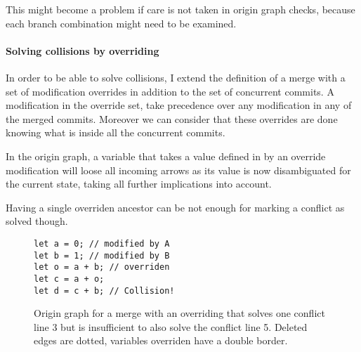 \documentclass[a4paper,10pt]{article}
\begin{document}
This might become a problem if care is not taken in origin graph checks, because each branch combination might need to be examined.

\paragraph{Solving collisions by overriding}
In order to be able to solve collisions, I extend the definition of a merge with a set of modification overrides in addition to the set of concurrent commits.
A modification in the override set, take precedence over any modification in any of the merged commits. Moreover we can consider that these overrides are done knowing what is inside all the concurrent commits.

In the origin graph, a variable that takes a value defined in by an override modification will loose all incoming arrows as its value is now disambiguated for the current state, taking all further implications into account.

Having a single overriden ancestor can be not enough for marking a conflict as solved though.

\begin{figure}[ht]
\begin{minipage}{.5\textwidth}
\begin{lstlisting}
let a = 0; // modified by A
let b = 1; // modified by B
let o = a + b; // overriden
let c = a + o;
let d = c + b; // Collision!
\end{lstlisting}
\end{minipage}\hfill
\begin{minipage}{.45\textwidth}
\centering{}
\end{minipage}
\caption{Origin graph for a merge with an overriding that solves one conflict line 3 but is insufficient to also solve the conflict line 5. Deleted edges are dotted, variables overriden have a double border.}
\end{figure}
\end{document}
